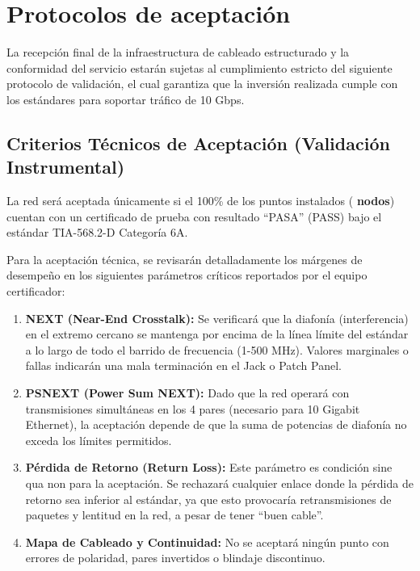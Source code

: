 \section{Protocolos de aceptación}

La recepción final de la infraestructura de cableado estructurado y la conformidad del servicio estarán sujetas al cumplimiento estricto del siguiente protocolo de validación, el cual garantiza que la inversión realizada cumple con los estándares para soportar tráfico de 10 Gbps.

\subsection*{Criterios Técnicos de Aceptación (Validación Instrumental)}

La red será aceptada únicamente si el 100\% de los puntos instalados (\textbf{\totalPuntos{} nodos}) cuentan con un certificado de prueba con resultado ``PASA'' (PASS) bajo el estándar TIA-568.2-D Categoría 6A.

Para la aceptación técnica, se revisarán detalladamente los márgenes de desempeño en los siguientes parámetros críticos reportados por el equipo certificador:

\begin{enumerate}
    \item \textbf{NEXT (Near-End Crosstalk):} Se verificará que la diafonía (interferencia) en el extremo cercano se mantenga por encima de la línea límite del estándar a lo largo de todo el barrido de frecuencia (1-500 MHz). Valores marginales o fallas indicarán una mala terminación en el Jack o Patch Panel.
    \item \textbf{PSNEXT (Power Sum NEXT):} Dado que la red operará con transmisiones simultáneas en los 4 pares (necesario para 10 Gigabit Ethernet), la aceptación depende de que la suma de potencias de diafonía no exceda los límites permitidos.
    \item \textbf{Pérdida de Retorno (Return Loss):} Este parámetro es condición sine qua non para la aceptación. Se rechazará cualquier enlace donde la pérdida de retorno sea inferior al estándar, ya que esto provocaría retransmisiones de paquetes y lentitud en la red, a pesar de tener ``buen cable''.
    \item \textbf{Mapa de Cableado y Continuidad:} No se aceptará ningún punto con errores de polaridad, pares invertidos o blindaje discontinuo.
\end{enumerate}

